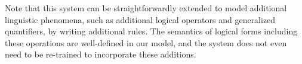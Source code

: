 \documentclass[11pt]{article}
\begin{document}

Note that this system can be straightforwardly extended to model
additional linguistic phenomena, such as additional logical operators
and generalized quantifiers, by writing additional rules. The
semantics of logical forms including these operations are well-defined
in our model, and the system does not even need to be re-trained to
incorporate these additions.


\end{document}
